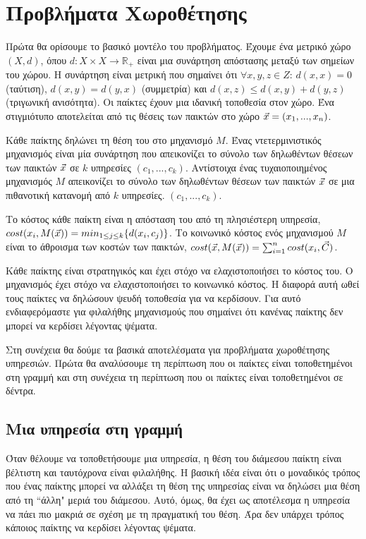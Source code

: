 \section{Προβλήματα Χωροθέτησης}

Πρώτα θα ορίσουμε το βασικό μοντέλο του προβλήματος. Έχουμε ένα μετρικό χώρο $(X,d)$, όπου $d:X \times X  \rightarrow \mathbb{R}_{+}$ είναι μια συνάρτηση απόστασης μεταξύ των σημείων του χώρου. Η συνάρτηση είναι μετρική που σημαίνει ότι $\forall x,y,z \in Z$: $d(x,x)=0$ (ταύτιση), $d(x,y)=d(y,x)$ (συμμετρία) και $d(x,z)\le d(x,y)+d(y,z)$ (τριγωνική ανισότητα). Οι παίκτες έχουν μια ιδανική τοποθεσία στον χώρο. Ένα στιγμιότυπο αποτελείται από τις θέσεις των παικτών στο χώρο $\vec{x}=(x_1,...,x_n)$. 


Κάθε παίκτης δηλώνει τη θέση του στο μηχανισμό $M$. Ένας ντετερμινιστικός μηχανισμός είναι μία συνάρτηση που απεικονίζει το σύνολο των δηλωθέντων θέσεων των παικτών $\vec{x}$ σε $k$ υπηρεσίες $(c_1,...,c_k)$. Αντίστοιχα ένας τυχαιοποιημένος μηχανισμός $M$ απεικονίζει το σύνολο των δηλωθέντων θέσεων των παικτών $\vec{x}$ σε μια πιθανοτική κατανομή από $k$ υπηρεσίες. $(c_1,...,c_k)$.  


 Tο κόστος κάθε παίκτη είναι η απόσταση του από τη πλησιέστερη υπηρεσία, $cost(x_i,M(\vec{x})) = min_{1\le j \le k} \{d(x_i,c_j) \}$. Το κοινωνικό κόστος ενός μηχανισμού $M$ είναι το άθροισμα των κοστών των παικτών, $ cost(\vec{x},M(\vec{x})) = \sum_{i=1}^{n} cost(x_i,\vec{C})$.
 
 Κάθε παίκτης είναι στρατηγικός και έχει στόχο να ελαχιστοποιήσει το κόστος του. Ο μηχανισμός έχει στόχο να ελαχιστοποιήσει το κοινωνικό κόστος. Η διαφορά αυτή ωθεί τους παίκτες να δηλώσουν ψευδή τοποθεσία για να κερδίσουν. Για αυτό ενδιαφερόμαστε για φιλαλήθης μηχανισμούς που σημαίνει ότι κανένας παίκτης δεν μπορεί να κερδίσει λέγοντας ψέματα.
 
 Στη συνέχεια θα δούμε τα βασικά αποτελέσματα για προβλήματα χωροθέτησης υπηρεσιών. Πρώτα θα αναλύσουμε τη περίπτωση που οι παίκτες είναι τοποθετημένοι στη γραμμή και στη συνέχεια τη περίπτωση που οι παίκτες είναι τοποθετημένοι σε δέντρα.
 
 
 
 
\subsection*{Μια υπηρεσία στη γραμμή}

Όταν θέλουμε να τοποθετήσουμε μια υπηρεσία, η θέση του διάμεσου παίκτη είναι βέλτιστη και ταυτόχρονα είναι φιλαλήθης. Η βασική ιδέα είναι ότι ο μοναδικός τρόπος που ένας παίκτης μπορεί να αλλάξει τη θέση της υπηρεσίας είναι να δηλώσει μια θέση από τη ``άλλη" μεριά του διάμεσου. Αυτό, όμως, θα έχει ως αποτέλεσμα η υπηρεσία να πάει πιο μακριά σε σχέση με τη πραγματική του θέση. Άρα δεν υπάρχει τρόπος κάποιος παίκτης να κερδίσει λέγοντας ψέματα.

